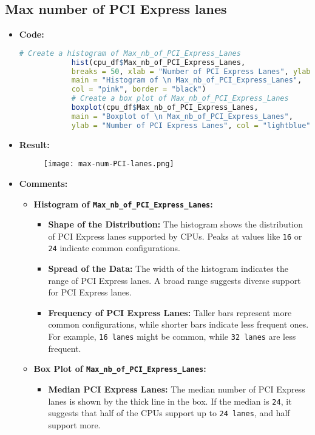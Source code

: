 \documentclass{article}
\begin{document}
	\subsection{Max number of PCI Express lanes}
	\begin{itemize}
		\item \textbf{Code:}
		\begin{lstlisting}[basicstyle=\ttfamily, frame=single,language=R]
			# Create a histogram of Max_nb_of_PCI_Express_Lanes
			hist(cpu_df$Max_nb_of_PCI_Express_Lanes, 
			breaks = 50, xlab = "Number of PCI Express Lanes", ylab = "Frequency", 
			main = "Histogram of \n Max_nb_of_PCI_Express_Lanes", 
			col = "pink", border = "black")
			# Create a box plot of Max_nb_of_PCI_Express_Lanes
			boxplot(cpu_df$Max_nb_of_PCI_Express_Lanes, 
			main = "Boxplot of \n Max_nb_of_PCI_Express_Lanes", 
			ylab = "Number of PCI Express Lanes", col = "lightblue", border = "black")
		\end{lstlisting}
		\item \textbf{Result:}
		\begin{figure}[h]
			\centering
			\texttt{[image: max-num-PCI-lanes.png]}  %
			\label{fig:enter-label}
		\end{figure}
		\item \textbf{Comments:}
		\begin{itemize}
			\item \textbf{Histogram of \texttt{Max\_nb\_of\_PCI\_Express\_Lanes}:}
			\begin{itemize}
				\item \textbf{Shape of the Distribution:} The histogram shows the distribution of PCI Express lanes supported by CPUs. Peaks at values like \texttt{16} or \texttt{24} indicate common configurations.
				\item \textbf{Spread of the Data:} The width of the histogram indicates the range of PCI Express lanes. A broad range suggests diverse support for PCI Express lanes.
				\item \textbf{Frequency of PCI Express Lanes:} Taller bars represent more common configurations, while shorter bars indicate less frequent ones. For example, \texttt{16 lanes} might be common, while \texttt{32 lanes} are less frequent.
			\end{itemize}
			\item \textbf{Box Plot of \texttt{Max\_nb\_of\_PCI\_Express\_Lanes}:}
			\begin{itemize}
				\item \textbf{Median PCI Express Lanes:} The median number of PCI Express lanes is shown by the thick line in the box. If the median is \texttt{24}, it suggests that half of the CPUs support up to \texttt{24 lanes}, and half support more.

\end{itemize}
\end{itemize}
\end{itemize}
\end{document}
